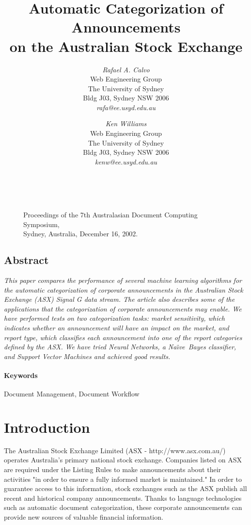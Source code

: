 \documentclass[twocolumn]{article}
\title{Automatic Categorization of Announcements \\ on the Australian Stock Exchange}
\author{
{\em Rafael A. Calvo}\\[1ex]
Web Engineering Group\\
The University of Sydney\\
Bldg J03, Sydney NSW 2006\\[1ex]
{\em rafa@ee.usyd.edu.au}
\and
{\em Ken Williams}\\[1ex]
Web Engineering Group\\
The University of Sydney\\
Bldg J03, Sydney NSW 2006\\[1ex]
{\em kenw@ee.usyd.edu.au}
}
\date{}
\newcommand{\naive}{Na\"\i ve}
\begin{document}
\maketitle
\thispagestyle{empty}

        \begin{figure}[b]
	~\\
        \noindent
        {\small\bf\raggedright
        Proceedings of the 7th Australasian 
	Document Computing Symposium,\\
	Sydney, Australia,
        December 16, 2002.
        }
        \end{figure}


\subsection*{\centering Abstract}
\noindent
{\it 
This paper compares the performance of several machine learning
algorithms for the automatic categorization of corporate announcements
in the Australian Stock Exchange (ASX) Signal G data stream. The
article also describes some of the applications that the
categorization of corporate announcements may enable. We have
performed tests on two categorization tasks: market sensitivity, which
indicates whether an announcement will have an impact on the market,
and report type, which classifies each announcement into one of the
report categories defined by the ASX. We have tried Neural Networks, a
\naive\ Bayes classifier, and Support Vector Machines and achieved
good results.
}

\paragraph{Keywords} 
Document Management, Document Workflow

\section{Introduction}
\label{introduction}

The Australian Stock Exchange Limited (ASX - http://www.asx.com.au/)
operates Australia's primary national stock exchange.  Companies
listed on ASX are required under the Listing Rules to make
announcements about their activities "in order to ensure a fully
informed market is maintained." \cite{asx:02} In order to guarantee
access to this information, stock exchanges such as the ASX publish
all recent and historical company announcements.  Thanks to language
technologies such as automatic document categorization, these
corporate announcements can provide new sources of valuable financial
information.
\end{document}
